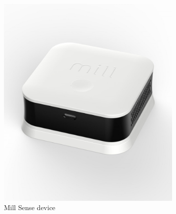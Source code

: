 \begin{figure} [H]
    \centering
    \begin{subfigure}{0.3\textwidth}
         \centering
         \includegraphics[width=1\textwidth]{figures/MillSense.jpg}
         \caption{Mill Sense device \cite{MillSense}}
         \label{fig:MillSenseDev}
     \end{subfigure}
     \hspace{2cm}
    \begin{subfigure}{0.3\textwidth}
         \centering

\end{subfigure}
\end{figure}
